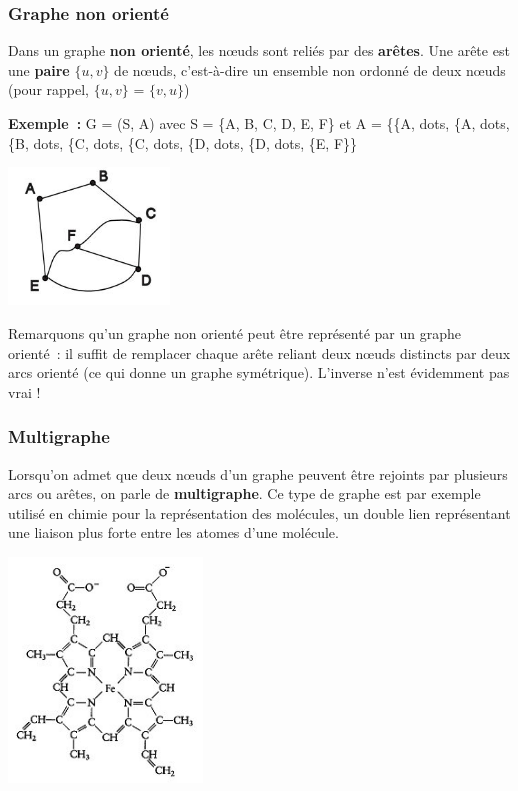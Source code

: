 		\subsubsection{Graphe non orienté}
			
			Dans un graphe \textbf{non orienté}, les n{\oe}uds sont 
			reliés par des \textbf{arêtes}. Une arête est une \textbf{paire}
			$\{u, v\}$ de n{\oe}uds, c'est-à-dire un ensemble non ordonné 
			de deux n{\oe}uds (pour rappel,
			$\{u, v\}$ = $\{v, u\}$)

			\textbf{Exemple~:} G = (S, A) avec S = \{A, B, C, D, E, F\} et 
			A = \{\{A, {dots}, \{A, {dots}, \{B, {dots}, \{C, {dots}, \{C, {dots}, \{D, {dots},
			\{D, {dots}, \{E, F\}\}

			\begin{center}
			\includegraphics[width=4.284cm,height=3.657cm]{image/a2012Logique2eme-img043.jpg}
			\end{center}

			Remarquons qu'un graphe non orienté peut être représenté par un 
			graphe orienté~: il suffit de remplacer chaque arête
			reliant deux n{\oe}uds distincts par deux arcs orienté (ce qui donne 
			un graphe symétrique). L'inverse n'est évidemment pas vrai !

		\subsubsection{Multigraphe}
			
			Lorsqu'on admet que deux n{\oe}uds d'un graphe peuvent 
			être rejoints par plusieurs arcs ou arêtes, on parle de
			\textbf{multigraphe}. Ce type de graphe est par exemple 
			utilisé en chimie pour la représentation des molécules, un
			double lien représentant une liaison plus forte entre 
			les atomes d'une molécule.

			\begin{center}
			\includegraphics[width=5.172cm,height=5.974cm]{image/a2012Logique2eme-img044.jpg}
			\end{center}

